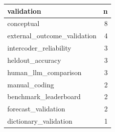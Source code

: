 \begin{tabular}{lr}
\toprule
validation & n \\
\midrule
conceptual & 8 \\
external\_outcome\_validation & 4 \\
intercoder\_reliability & 3 \\
heldout\_accuracy & 3 \\
human\_llm\_comparison & 3 \\
manual\_coding & 2 \\
benchmark\_leaderboard & 2 \\
forecast\_validation & 2 \\
dictionary\_validation & 1 \\
\bottomrule
\end{tabular}
